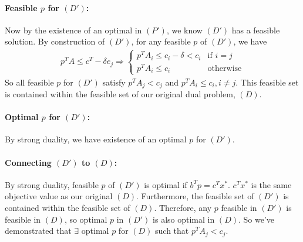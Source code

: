 \documentclass[12pt]{exam}
\begin{document}
\begin{questions}
\begin{parts}
        \paragraph{Feasible $p$ for $(D')$:} Now by the existence of an optimal in $(P')$, we know $(D')$ has a feasible solution. By construction of $(D')$, for any feasible $p$ of $(D')$, we have 
        \begin{align*}
          p^TA \leq c^T - \delta e_j \Longrightarrow \begin{cases}
            p^TA_i \leq c_i - \delta < c_i & \text{if } i = j\\
            p^TA_i \leq c_i & \text{otherwise}
          \end{cases}
        \end{align*}
        So all feasible $p$ for $(D')$ satisfy $p^TA_j < c_j$ and $p^TA_i \leq c_i, i\neq j$. This feasible set is contained within the feasible set of our original dual problem, $(D)$.
        
        \paragraph{Optimal $p$ for $(D')$:} By strong duality, we have existence of an optimal $p$ for $(D')$. 
        
        \paragraph{Connecting $(D')$ to $(D)$:} By strong duality, feasible $p$ of $(D')$ is optimal if $b^Tp = c^Tx^*$. $c^Tx^*$ is the same objective value as our original $(D)$. Furthermore, the feasible set of $(D')$ is contained within the feasible set of $(D)$. Therefore, any $p$ feasible in $(D')$ is feasible in $(D)$, so optimal $p$ in $(D')$ is also optimal in $(D)$. So we've demonstrated that $\exists$ optimal $p$ for $(D)$ such that $p^TA_j < c_j$. 
        


\end{parts}
\end{questions}
\end{document}
